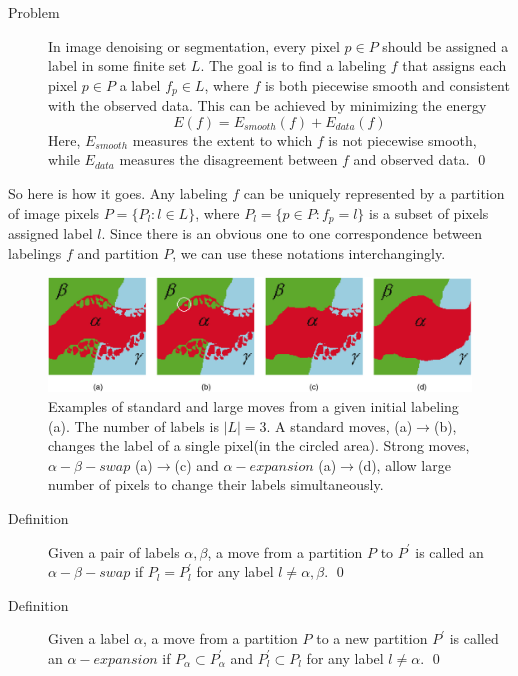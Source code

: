 \documentclass[openany]{memoir}
\begin{document}
\begin{description}
\item[Problem] In image denoising or segmentation, every pixel $p \in P$ should be assigned a label in some finite set $L$. The goal is to find a labeling $f$ that assigns each pixel $p \in P$ a label $f_p \in L$, where $f$ is both piecewise smooth and consistent with the observed data. This can be achieved by minimizing the energy
$$E(f) = E_{smooth}(f) + E_{data}(f)$$
Here, $E_{smooth}$ measures the extent to which $f$ is not piecewise smooth, while $E_{data}$ measures the disagreement between $f$ and observed data. \qed
\end{description}

So here is how it goes. Any labeling $f$ can be uniquely represented by a partition of image pixels $P = \{P_l : l \in L\}$, where $P_l = \{p \in P : f_p = l\}$ is a subset of pixels assigned label $l$. Since there is an obvious one to one correspondence between labelings $f$ and partition $P$, we can use these notations interchangingly.

\clearpage

\begin{figure}
\includegraphics[width=\textwidth]{./operations.png}
\caption{Examples of standard and large moves from a given initial labeling (a). The number of labels is $|L|=3$. A standard moves, (a)$\rightarrow$(b), changes the label of a single pixel(in the circled area). Strong moves, $\alpha - \beta-swap$ (a)$\rightarrow$(c) and $\alpha-expansion$ (a)$\rightarrow$(d), allow large number of pixels to change their labels simultaneously.}
\end{figure}

\begin{description}
\item[Definition] Given a pair of labels $\alpha, \beta$, a move from a partition $P$ to $P^{'}$ is called an $\alpha-\beta-swap$ if $P_l = P_{l}^{'}$ for any label $l \neq \alpha,\beta$. \qed
\item[Definition] Given a label $\alpha$, a move from a partition $P$ to a new partition $P^{'}$ is called an $\alpha-expansion$ if $P_{\alpha} \subset P_{\alpha}^{'}$ and $P_{l}^{'} \subset P_{l}$ for any label $l \neq \alpha$. \qed
\end{description}
\end{document}
